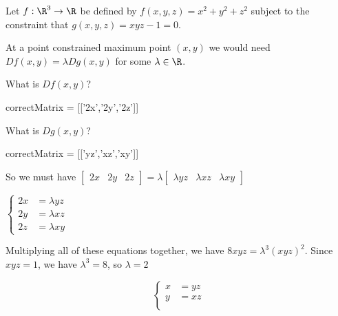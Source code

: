 \documentclass{ximera}
\begin{document}
	\begin{question}
		Let $f:\R^3 \to \R$ be defined by $f(x,y,z) = x^2+y^2+z^2$ subject to the constraint that $g(x,y,z) = xyz -1 = 0 $.  
		\begin{solution}
			\begin{hint}
			    At a point constrained maximum point $(x,y)$ we would need $Df(x,y) = \lambda Dg(x,y)$ for some $\lambda \in \R$.
		    \end{hint}
			\begin{hint}
			\begin{question}
			\begin{solution}
				What is $Df(x,y)$?
					\begin{matrix-answer}
						correctMatrix = [['2x','2y','2z']]
					\end{matrix-answer}
			\end{solution}
			\begin{solution}
				What is $Dg(x,y)$?
					\begin{matrix-answer}
						correctMatrix = [['yz','xz','xy']]
					\end{matrix-answer}
			\end{solution}
			\end{question}
		\end{hint}
			\begin{hint}
				So we must have \(\begin{bmatrix} 2x & 2y & 2z\end{bmatrix} = \lambda \begin{bmatrix} \lambda yz & \lambda xz & \lambda xy\end{bmatrix}\)
			\end{hint}
			\begin{hint}
				\(
					\begin{cases}
						2x &= \lambda yz\\
						2y &= \lambda xz\\
						2z &= \lambda xy
					  \end{cases}
					\)
			\end{hint}
			\begin{hint}
				Multiplying all of these equations together, we have $8xyz  = \lambda^3(xyz)^2$.  Since $xyz=1$, we have $\lambda^3 = 8$, so $\lambda =2$
			\end{hint}
			\begin{hint}
				\[
					\begin{cases}
						x &=  yz\\
						y &=  xz\\

\end{cases}\]
\end{hint}
\end{solution}
\end{question}
\end{document}
